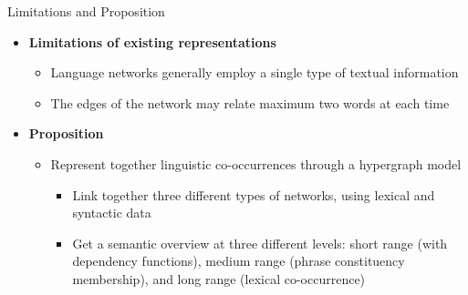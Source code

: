 \documentclass[10pt,xcolor=table]{beamer}
\begin{document}
\begin{frame}{Limitations and Proposition}
\begin{itemize}[<+- | alert@+>]
\item \large \textbf{Limitations of existing representations}
	\begin{itemize}
	\item Language networks generally employ a single type of textual information
	\item The edges of the network may relate maximum two words at each time
	\end{itemize}
\item \large \textbf{Proposition}
	\begin{itemize}
	\item Represent together linguistic co-occurrences through a hypergraph model
	\begin{itemize}
	\item Link together three different types of networks, using lexical and syntactic data
	\item Get a semantic overview at three different levels: short range (with dependency functions), medium range (phrase constituency membership), and long range (lexical  co-occurrence) 
	\end{itemize}
	
	\end{itemize}
\end{itemize}
\vspace{\textheight}
\end{frame}

%	
%
\end{document}
